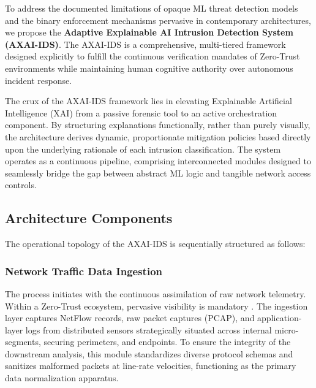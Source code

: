 \documentclass[conference]{IEEEtran}
\begin{document}
To address the documented limitations of opaque ML threat detection models and the binary enforcement mechanisms pervasive in contemporary architectures, we propose the \textbf{Adaptive Explainable AI Intrusion Detection System (AXAI-IDS)}. The AXAI-IDS is a comprehensive, multi-tiered framework designed explicitly to fulfill the continuous verification mandates of Zero-Trust environments while maintaining human cognitive authority over autonomous incident response. 

The crux of the AXAI-IDS framework lies in elevating Explainable Artificial Intelligence (XAI) from a passive forensic tool to an active orchestration component. By structuring explanations functionally, rather than purely visually, the architecture derives dynamic, proportionate mitigation policies based directly upon the underlying rationale of each intrusion classification. The system operates as a continuous pipeline, comprising interconnected modules designed to seamlessly bridge the gap between abstract ML logic and tangible network access controls.

\subsection{Architecture Components}

The operational topology of the AXAI-IDS is sequentially structured as follows:

\subsubsection{Network Traffic Data Ingestion}
The process initiates with the continuous assimilation of raw network telemetry. Within a Zero-Trust ecosystem, pervasive visibility is mandatory \cite{ke2017lightgbm}. The ingestion layer captures NetFlow records, raw packet captures (PCAP), and application-layer logs from distributed sensors strategically situated across internal micro-segments, securing perimeters, and endpoints. To ensure the integrity of the downstream analysis, this module standardizes diverse protocol schemas and sanitizes malformed packets at line-rate velocities, functioning as the primary data normalization apparatus.
\end{document}
